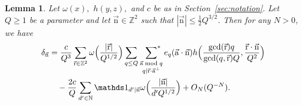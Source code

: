 \documentclass[letterpaper,11pt]{amsart}
\numberwithin{equation}{section}
\newtheorem{lemma}[theorem]{Lemma}
\theoremstyle{definition}
\numberwithin{equation}{section}
\newcommand{\ZZ}{\mathbb{Z}}
\newcommand{\NN}{\mathbb{N}}
\newcommand{\starsum}{\sideset{}{^*}\sum}
\newcommand{\ua}{\vec{\mathrm{a}}}
\newcommand{\ur}{\vec{\mathrm{r}}}
\newcommand{\nn}{\vec{\mathrm{n}}}
\begin{document}
\begin{lemma}\label{lem:duality} 
	Let $\omega(x),$ $ h(y,z),$ and $c$ be as in Section~\ref{sec:notation}.
	Let $Q\geq1$ be a parameter and let $ \nn\in \mathbb Z^2$ such that $|\nn|\leq \frac 12Q^{3/2}$. Then for any $N>0$, we have 
	\begin{align}\label{eq:duality}
	\delta_{\nn}&=\frac{c}{Q^3}\sum_{\ur\in\ZZ^2}\omega\Big(\frac{|\ur|}{Q^{1/2}}\Big)\sum_{q\leq Q}\,\,\starsum_{\substack{\ua \bmod q\\ q\mid \ur \cdot \ua^\perp}}e_q(\ua \cdot \nn)h\Big(\frac{\gcd(\ur)q}{\gcd(q,\ur)Q}, \frac{\ur \cdot \nn}{Q^2}\Big)\\& \quad -\frac{2c}{Q}\sum_{d'\in \NN}\mathds 1_{d'\mid \nn}\omega\Big(\frac{|\nn|}{d'Q^{1/2}}\Big)+O_N(Q^{-N}).\nonumber
	\end{align}
\end{lemma}
\end{document}
